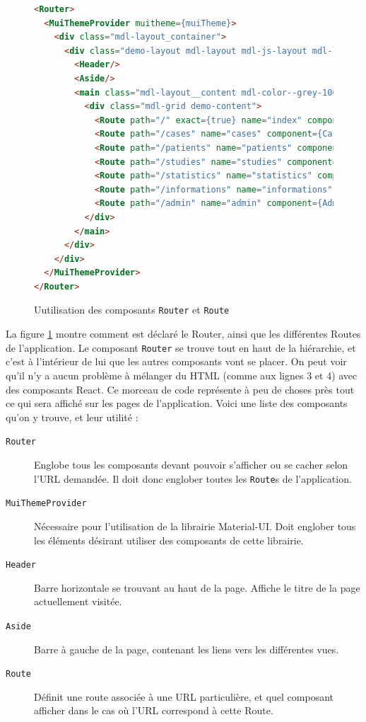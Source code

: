 \begin{figure}[!h]
\begin{lstlisting}[language=html]
<Router>
  <MuiThemeProvider muitheme={muiTheme}>
    <div class="mdl-layout_container">
      <div class="demo-layout mdl-layout mdl-js-layout mdl-layout--fixed-drawer mdl-layout--fixed-header">
        <Header/>
        <Aside/>
        <main class="mdl-layout__content mdl-color--grey-100">
          <div class="mdl-grid demo-content">
            <Route path="/" exact={true} name="index" component={Index}></Route>
            <Route path="/cases" name="cases" component={Cases}></Route>
            <Route path="/patients" name="patients" component={Patients}></Route>
            <Route path="/studies" name="studies" component={Studies}></Route>
            <Route path="/statistics" name="statistics" component={Statistics}></Route>
            <Route path="/informations" name="informations" component={Informations}></Route>
            <Route path="/admin" name="admin" component={Admin}></Route>
          </div>
        </main>
      </div>
    </div>
  </MuiThemeProvider>
</Router> \end{lstlisting}
\caption{Uutilisation des composants \texttt{Router} et \texttt{Route}}
\label{router-component}
\end{figure}

		La figure \ref{router-component} montre comment est déclaré le Router, ainsi que les différentes Routes de l'application. Le composant \texttt{Router} se trouve tout en haut de la hiérarchie, et c'est à l'intérieur de lui que les autres composants vont se placer. On peut voir qu'il n'y a aucun problème à mélanger du HTML (comme aux lignes 3 et 4) avec des composants React. Ce morceau de code représente à peu de choses près tout ce qui sera affiché sur les pages de l'application. Voici une liste des composants qu'on y trouve, et leur utilité :

		\begin{description}
			\item[\texttt{Router}] Englobe tous les composants devant pouvoir s'afficher ou se cacher selon l'URL demandée. Il doit donc englober toutes les \texttt{Route}s de l'application.
			\item[\texttt{MuiThemeProvider}] Nécessaire pour l'utilisation de la librairie Material-UI. Doit englober tous les éléments désirant utiliser des composants de cette librairie.
			\item[\texttt{Header}] Barre horizontale se trouvant au haut de la page. Affiche le titre de la page actuellement visitée.
			\item[\texttt{Aside}] Barre à gauche de la page, contenant les liens vers les différentes vues.
			\item[\texttt{Route}] Définit une route associée à une URL particulière, et quel composant afficher dans le cas où l'URL correspond à cette Route.
		\end{description}


